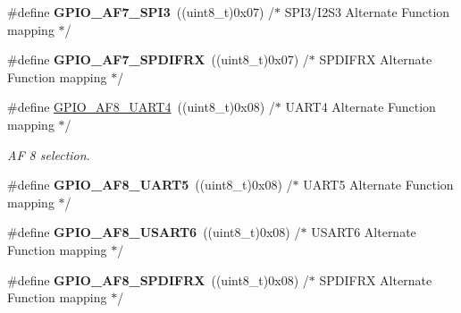 \begin{DoxyCompactItemize}
\item 
\#define {\bfseries G\+P\+I\+O\+\_\+\+A\+F7\+\_\+\+S\+P\+I3}~((uint8\+\_\+t)0x07)  /$\ast$ S\+P\+I3/\+I2\+S3 Alternate Function mapping  $\ast$/\hypertarget{group___g_p_i_o___alternate__function__selection_ga35733bc86ec4a7141898a9c2b7ca644a}{}\label{group___g_p_i_o___alternate__function__selection_ga35733bc86ec4a7141898a9c2b7ca644a}

\item 
\#define {\bfseries G\+P\+I\+O\+\_\+\+A\+F7\+\_\+\+S\+P\+D\+I\+F\+RX}~((uint8\+\_\+t)0x07)  /$\ast$ S\+P\+D\+I\+F\+R\+X Alternate Function mapping      $\ast$/\hypertarget{group___g_p_i_o___alternate__function__selection_ga42a8f08649d4b95cfcbdd918d75129e7}{}\label{group___g_p_i_o___alternate__function__selection_ga42a8f08649d4b95cfcbdd918d75129e7}

\item 
\#define \hyperlink{group___g_p_i_o___alternate__function__selection_gae634fa0570cb4bc20217130da41737e1}{G\+P\+I\+O\+\_\+\+A\+F8\+\_\+\+U\+A\+R\+T4}~((uint8\+\_\+t)0x08)  /$\ast$ U\+A\+R\+T4 Alternate Function mapping  $\ast$/\hypertarget{group___g_p_i_o___alternate__function__selection_gae634fa0570cb4bc20217130da41737e1}{}\label{group___g_p_i_o___alternate__function__selection_gae634fa0570cb4bc20217130da41737e1}

\begin{DoxyCompactList}\small\item\em AF 8 selection. \end{DoxyCompactList}\item 
\#define {\bfseries G\+P\+I\+O\+\_\+\+A\+F8\+\_\+\+U\+A\+R\+T5}~((uint8\+\_\+t)0x08)  /$\ast$ U\+A\+R\+T5 Alternate Function mapping  $\ast$/\hypertarget{group___g_p_i_o___alternate__function__selection_gaecc040c19db2837cbd43e45a0ea8e711}{}\label{group___g_p_i_o___alternate__function__selection_gaecc040c19db2837cbd43e45a0ea8e711}

\item 
\#define {\bfseries G\+P\+I\+O\+\_\+\+A\+F8\+\_\+\+U\+S\+A\+R\+T6}~((uint8\+\_\+t)0x08)  /$\ast$ U\+S\+A\+R\+T6 Alternate Function mapping $\ast$/\hypertarget{group___g_p_i_o___alternate__function__selection_gafc87c8af2ec9b5a7766fcc83088fe310}{}\label{group___g_p_i_o___alternate__function__selection_gafc87c8af2ec9b5a7766fcc83088fe310}

\item 
\#define {\bfseries G\+P\+I\+O\+\_\+\+A\+F8\+\_\+\+S\+P\+D\+I\+F\+RX}~((uint8\+\_\+t)0x08)  /$\ast$ S\+P\+D\+I\+F\+R\+X Alternate Function mapping  $\ast$/\hypertarget{group___g_p_i_o___alternate__function__selection_ga532b9f7e18ea1c8a3dc1464fe69f0bdc}{}\label{group___g_p_i_o___alternate__function__selection_ga532b9f7e18ea1c8a3dc1464fe69f0bdc}


\end{DoxyCompactItemize}

